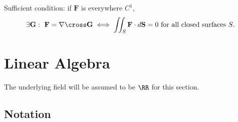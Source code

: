 \begin{proposition}

Sufficient condition: if \(\mathbf{F}\) is everywhere \(C^1\),
\begin{align*}
\exists \mathbf{G}:~ \mathbf{F} 
= \nabla \cross \mathbf{G} 
\iff \iint_S \mathbf{F}\cdot d\mathbf{S} = 0 \text{ for all closed surfaces }S
.\end{align*}

\end{proposition}

\hypertarget{linear-algebra}{%
\section{Linear Algebra}\label{linear-algebra}}

\begin{remark}

The underlying field will be assumed to be \(\RR\) for this section.

\end{remark}

\hypertarget{notation-2}{%
\subsection{Notation}\label{notation-2}}

